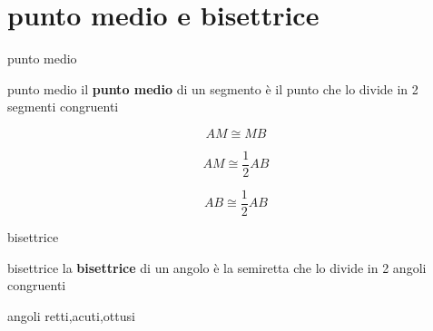 \documentclass{beamer}
\begin{document}
\section{punto medio e bisettrice}
\begin{frame}{punto medio}
    \begin{block}{punto medio}
       il \textbf{punto medio} di un segmento è il punto che lo divide in 2 segmenti congruenti
    \end{block}
    \begin{center}
  
    \end{center}
    $$AM \cong MB $$

    $$AM \cong \dfrac{1}{2}AB $$
   
    $$AB \cong \dfrac{1}{2}AB$$
\end{frame}
\begin{frame}{bisettrice}
    \begin{block}{bisettrice}
    la \textbf{bisettrice} di un angolo è la semiretta che lo divide in 2 angoli congruenti
    \end{block}
    \begin{center}
            
    \end{center}
\end{frame}
\begin{frame}{angoli retti,acuti,ottusi}

\end{frame}
\end{document}
